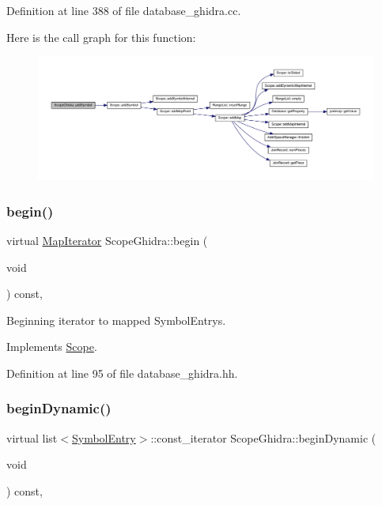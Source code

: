 Definition at line 388 of file database\+\_\+ghidra.\+cc.

Here is the call graph for this function\+:
\nopagebreak
\begin{figure}[H]
\begin{center}
\leavevmode
\includegraphics[width=350pt]{class_scope_ghidra_abb80f5f1b2391d5865f3c75ec1e03644_cgraph}
\end{center}
\end{figure}
\mbox{\label{class_scope_ghidra_ad17a63dadd4390989eaf9f20b8cbf173}} 
\subsubsection{\texorpdfstring{begin()}{begin()}}
{\footnotesize\ttfamily virtual \mbox{\hyperlink{class_map_iterator}{Map\+Iterator}} Scope\+Ghidra\+::begin (\begin{DoxyParamCaption}\item[{void}]{ }\end{DoxyParamCaption}) const\hspace{0.3cm}{\ttfamily [inline]}, {\ttfamily [virtual]}}



Beginning iterator to mapped Symbol\+Entrys. 



Implements \mbox{\hyperlink{class_scope_a054e7b7c470035be94e1e4229ff188d4}{Scope}}.



Definition at line 95 of file database\+\_\+ghidra.\+hh.

\mbox{\label{class_scope_ghidra_a4f5b42e5c99ea0581c4819b550c2fc27}} 
\subsubsection{\texorpdfstring{beginDynamic()}{beginDynamic()}\hspace{0.1cm}{\footnotesize\ttfamily [1/2]}}
{\footnotesize\ttfamily virtual list$<$\mbox{\hyperlink{class_symbol_entry}{Symbol\+Entry}}$>$\+::const\+\_\+iterator Scope\+Ghidra\+::begin\+Dynamic (\begin{DoxyParamCaption}\item[{void}]{ }\end{DoxyParamCaption}) const\hspace{0.3cm}{\ttfamily [inline]}, {\ttfamily [virtual]}}



